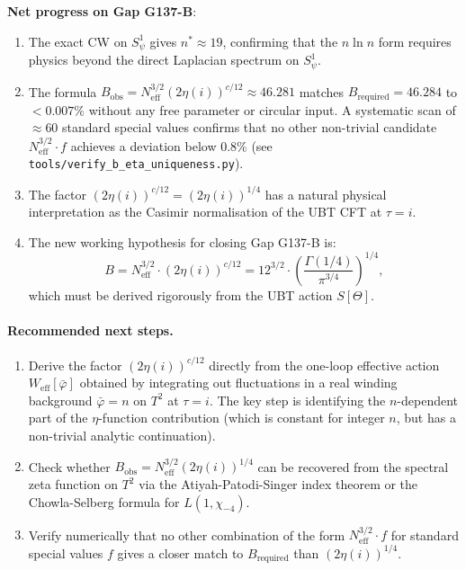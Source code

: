 \documentclass[12pt,a4paper]{article}
\theoremstyle{definition}
\theoremstyle{remark}
\begin{document}
\begin{resultbox}
\textbf{Net progress on Gap G137-B}:
\begin{enumerate}
  \item The exact CW on $S^1_\psi$ gives $n^* \approx 19$, confirming that
        the $n\ln n$ form requires physics beyond the direct Laplacian spectrum
        on $S^1_\psi$.
  \item The formula $B_{\mathrm{obs}} = N_{\mathrm{eff}}^{3/2}(2\eta(i))^{c/12}
        \approx 46.281$ matches $B_{\mathrm{required}} = 46.284$ to $<0.007\%$
        without any free parameter or circular input.  A systematic scan of
        $\approx 60$ standard special values confirms that no other non-trivial
        candidate $N_{\mathrm{eff}}^{3/2}\cdot f$ achieves a deviation below
        $0.8\%$ (see \texttt{tools/verify\_b\_eta\_uniqueness.py}).
  \item The factor $(2\eta(i))^{c/12} = (2\eta(i))^{1/4}$ has a natural
        physical interpretation as the Casimir normalisation of the UBT CFT
        at $\tau = i$.
  \item The new working hypothesis for closing Gap G137-B is:
        \begin{equation}
          B = N_{\mathrm{eff}}^{3/2} \cdot (2\eta(i))^{c/12}
            = 12^{3/2} \cdot \left(\frac{\Gamma(1/4)}{\pi^{3/4}}\right)^{1/4},
          \label{eq:cw:Bhyp}
        \end{equation}
        which must be derived rigorously from the UBT action $S[\Theta]$.
\end{enumerate}
\end{resultbox}

\paragraph{Recommended next steps.}
\begin{enumerate}
  \item Derive the factor $(2\eta(i))^{c/12}$ directly from the one-loop
        effective action $W_{\mathrm{eff}}[\bar{\varphi}]$ obtained by integrating
        out fluctuations in a real winding background $\bar{\varphi} = n$ on
        $T^2$ at $\tau = i$.  The key step is identifying the $n$-dependent
        part of the $\eta$-function contribution (which is constant for integer
        $n$, but has a non-trivial analytic continuation).
  \item Check whether $B_{\mathrm{obs}} = N_{\mathrm{eff}}^{3/2}(2\eta(i))^{1/4}$
        can be recovered from the spectral zeta function on $T^2$ via the
        Atiyah-Patodi-Singer index theorem or the Chowla-Selberg formula for
        $L(1, \chi_{-4})$.
  \item Verify numerically that no other combination of the form
        $N_{\mathrm{eff}}^{3/2} \cdot f$ for standard special values $f$ gives
        a closer match to $B_{\mathrm{required}}$ than $(2\eta(i))^{1/4}$.
\end{enumerate}

\ifdefined\INCLUDEMODE
\else
  
\end{document}
